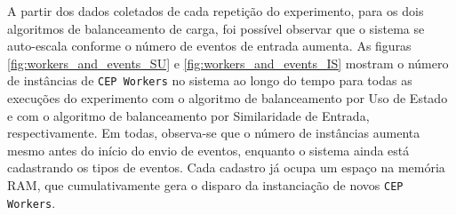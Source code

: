 




A partir dos dados coletados de cada repetição do experimento, para os dois algoritmos de balanceamento de carga, foi possível observar que o sistema se auto-escala conforme o número de eventos de entrada aumenta. As figuras \ref{fig:workers_and_events_SU}  e \ref{fig:workers_and_events_IS} mostram o número de instâncias de \texttt{CEP Workers} no sistema ao longo do tempo para todas as execuções do experimento com o algoritmo de balanceamento por Uso de Estado e com o algoritmo de balanceamento por Similaridade de Entrada, respectivamente. 
Em todas, observa-se que o número de instâncias aumenta mesmo antes do início do envio de eventos, enquanto o sistema ainda está cadastrando os tipos de eventos. Cada cadastro já ocupa um espaço na memória RAM, que cumulativamente gera o disparo da instanciação de novos \texttt{CEP Workers}.


